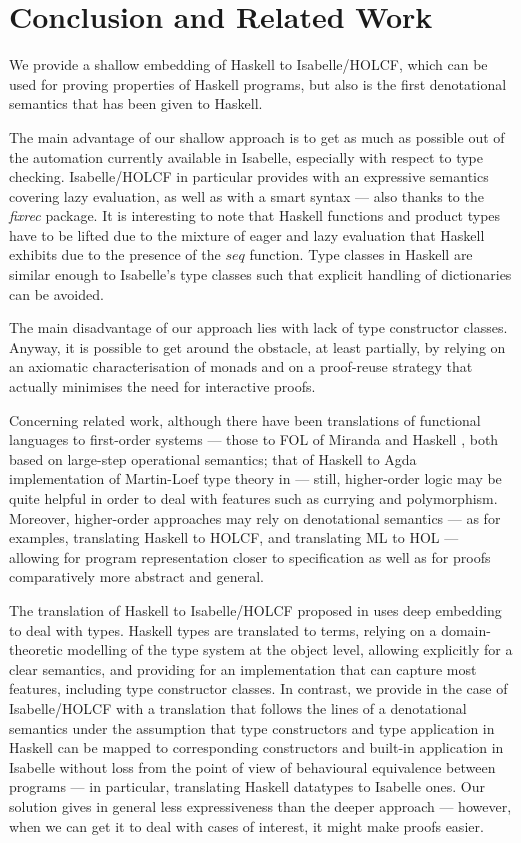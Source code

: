 \documentclass{llncs}
\begin{document}
\section{Conclusion and Related Work}
\label{sec:conclusion}

We provide a shallow embedding of Haskell to Isabelle/HOLCF,
which can be used for proving properties of Haskell programs,
but also is the first denotational semantics that has been
given to Haskell.

The main advantage of our shallow approach is to get as much as
possible out of the automation currently available in Isabelle,
especially with respect to type checking. Isabelle/HOLCF in particular
provides with an expressive semantics covering lazy evaluation, as
well as with a smart syntax --- also thanks to the \emph{fixrec}
package. It is interesting to note that Haskell functions and product
types have to be lifted due to the mixture of eager and lazy evaluation
that Haskell exhibits due to the presence of the $seq$ function.
Type classes in Haskell are similar enough to Isabelle's type classes
such that explicit handling of dictionaries can be avoided.

The main disadvantage of our approach lies with lack of type
constructor classes. Anyway, it is possible to get around the
obstacle, at least partially, by relying on an axiomatic
characterisation of monads and on a proof-reuse strategy that actually
minimises the need for interactive proofs.

Concerning related work, although there have been translations of
functional languages to first-order systems --- those to FOL of
Miranda \cite{Thompson95,Thompson89,Thompson95b} and Haskell
\cite{Thompson92}, both based on large-step operational semantics;
that of Haskell to Agda implementation of Martin-Loef type theory in
\cite{Abel} --- still, higher-order logic may be quite helpful in
order to deal with features such as currying and polymorphism.
Moreover, higher-order approaches may rely on denotational semantics
--- as for examples, \cite{Huff} translating Haskell to HOLCF, and
\cite{Pollack} translating ML to HOL --- allowing for program
representation closer to specification as well as for proofs
comparatively more abstract and general.

The translation of Haskell to Isabelle/HOLCF proposed in \cite{Huff}
uses deep embedding to deal with types.  Haskell types are translated
to terms, relying on a domain-theoretic modelling of the type system
at the object level, allowing explicitly for a clear semantics, and
providing for an implementation that can capture most features,
including type constructor classes.  In contrast, we provide in the
case of Isabelle/HOLCF with a translation that follows the lines of a
denotational semantics under the assumption that type constructors and
type application in Haskell can be mapped to corresponding
constructors and built-in application in Isabelle without loss from
the point of view of behavioural equivalence between programs --- in
particular, translating Haskell datatypes to Isabelle ones.  Our
solution gives in general less expressiveness than the deeper approach
--- however, when we can get it to deal with cases of interest, it
might make proofs easier.
\end{document}
